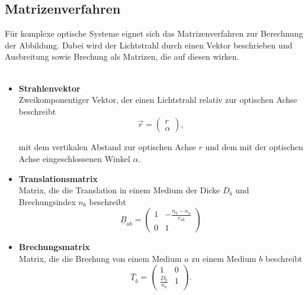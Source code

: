 \documentclass{article}
\begin{document}
\newpage


\subsection{Matrizenverfahren}
Für komplexe optische Systeme eignet sich das Matrizenverfahren zur Berechnung der Abbildung. Dabei wird der Lichtstrahl durch einen Vektor beschrieben und Ausbreitung sowie Brechung als Matrizen, die auf diesen wirken.\\
\\
	\begin{itemize}
		\item \textbf{Strahlenvektor}\\
		Zweikomponentiger Vektor, der einen Lichtstrahl relativ zur optischen Achse beschreibt
			\begin{equation}
				\vec{r} =
				\begin{pmatrix}
					r \\ \alpha
				\end{pmatrix},
			\end{equation}
			
			mit dem vertikalen Abstand zur optischen Achse $r$ und dem mit der optischen Achse eingeschlossenen Winkel $\alpha$.

		\item \textbf{Translationsmatrix}\\
		Matrix, die die Translation in einem Medium der Dicke $D_b$ und Brechungsindex $n_b$ beschreibt
			\begin{equation}
				\underline{B}_{ab} = 
				\begin{pmatrix}
					1 & -\frac{n_b - n_a}{r_{ab}} \\
					0 & 1
				\end{pmatrix}
			\end{equation}
		
		
		\item \textbf{Brechungsmatrix}\\
		Matrix, die die Brechung von einem Medium $a$ zu einem Medium $b$ beschreibt
			\begin{equation}
				\underline{T}_b =
				\begin{pmatrix}
					1 & 0\\
					\frac{D_b}{n_b} & 1
				\end{pmatrix}.
			\end{equation}
	\end{itemize}
	

\newpage
\end{document}
